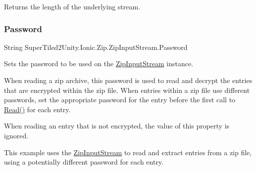 Returns the length of the underlying stream. 

\mbox{\label{class_super_tiled2_unity_1_1_ionic_1_1_zip_1_1_zip_input_stream_a152dfe460b16330a160db99eeffcf07c}} 
\subsubsection{\texorpdfstring{Password}{Password}}
{\footnotesize\ttfamily String Super\+Tiled2\+Unity.\+Ionic.\+Zip.\+Zip\+Input\+Stream.\+Password\hspace{0.3cm}{\ttfamily [set]}}



Sets the password to be used on the {\ttfamily \mbox{\hyperlink{class_super_tiled2_unity_1_1_ionic_1_1_zip_1_1_zip_input_stream}{Zip\+Input\+Stream}}} instance. 

When reading a zip archive, this password is used to read and decrypt the entries that are encrypted within the zip file. When entries within a zip file use different passwords, set the appropriate password for the entry before the first call to {\ttfamily \mbox{\hyperlink{class_super_tiled2_unity_1_1_ionic_1_1_zip_1_1_zip_input_stream_a172a23a02d3c7a34db7c6648c55fd299}{Read()}}} for each entry. 

When reading an entry that is not encrypted, the value of this property is ignored. 

This example uses the \mbox{\hyperlink{class_super_tiled2_unity_1_1_ionic_1_1_zip_1_1_zip_input_stream}{Zip\+Input\+Stream}} to read and extract entries from a zip file, using a potentially different password for each entry.


